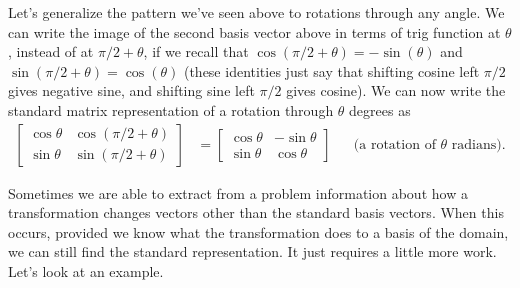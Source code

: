 Let's generalize the pattern we've seen above to rotations through any angle. We can write the image of the second basis vector above in terms of trig function at $\theta$, instead of at $\pi/2+\theta$, if we recall that $\cos(\pi/2+\theta) = -\sin(\theta)$ and $\sin(\pi/2+\theta) = \cos(\theta)$ (these identities just say that shifting cosine left $\pi/2$ gives negative sine, and shifting sine left $\pi/2$ gives cosine).  
We can now write the standard matrix representation of a rotation through $\theta$ degrees as
\begin{align*}
\begin{bmatrix}
\cos \theta&\cos(\pi/2+\theta)\\
\sin \theta&\sin(\pi/2+\theta)
\end{bmatrix}
&=
\begin{bmatrix}
\cos \theta&-\sin\theta\\
\sin \theta&\cos\theta
\end{bmatrix}
&& \text{(a rotation of $\theta$ radians)}.
\end{align*}




Sometimes we are able to extract from a problem information about how a transformation changes vectors other than the standard basis vectors.  When this occurs, provided we know what the transformation does to a basis of the domain, we can still find the standard representation. It just requires a little more work. Let's look at an example. 

